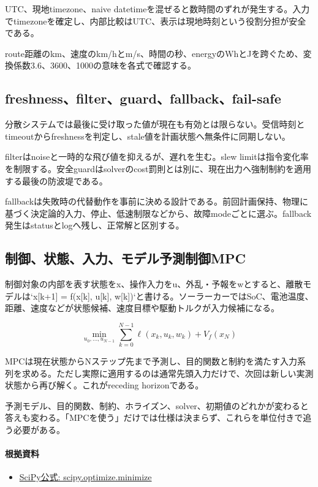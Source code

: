 \documentclass[a4paper,11pt]{article}
\begin{document}
UTC、現地timezone、naive datetimeを混ぜると数時間のずれが発生する。入力でtimezoneを確定し、内部比較はUTC、表示は現地時刻という役割分担が安全である。


route距離のkm、速度のkm/hとm/s、時間の秒、energyのWhとJを跨ぐため、変換係数3.6、3600、1000の意味を各式で確認する。



\subsection{freshness、filter、guard、fallback、fail-safe}
分散システムでは最後に受け取った値が現在も有効とは限らない。受信時刻とtimeoutからfreshnessを判定し、stale値を計画状態へ無条件に同期しない。


filterはnoiseと一時的な飛び値を抑えるが、遅れを生む。slew limitは指令変化率を制限する。安全guardはsolverのcost罰則とは別に、現在出力へ強制制約を適用する最後の防波堤である。


fallbackは失敗時の代替動作を事前に決める設計である。前回計画保持、物理に基づく決定論的入力、停止、低速制限などから、故障modeごとに選ぶ。fallback発生はstatusとlogへ残し、正常解と区別する。



\subsection{制御、状態、入力、モデル予測制御MPC}
制御対象の内部を表す状態をx、操作入力をu、外乱・予報をwとすると、離散モデルは`x[k+1] = f(x[k], u[k], w[k])`と書ける。ソーラーカーではSoC、電池温度、距離、速度などが状態候補、速度目標や駆動トルクが入力候補になる。


\[
\min_{u_0,\ldots,u_{N-1}} \sum_{k=0}^{N-1}\ell(x_k,u_k,w_k)+V_f(x_N)
\]

MPCは現在状態からNステップ先まで予測し、目的関数と制約を満たす入力系列を求める。ただし実際に適用するのは通常先頭入力だけで、次回は新しい実測状態から再び解く。これがreceding horizonである。


予測モデル、目的関数、制約、ホライズン、solver、初期値のどれかが変わると答えも変わる。「MPCを使う」だけでは仕様は決まらず、これらを単位付きで追う必要がある。

\paragraph{根拠資料}
\begin{itemize}[leftmargin=1.6em]
\item \href{https://docs.scipy.org/doc/scipy/reference/generated/scipy.optimize.minimize.html}{SciPy公式: scipy.optimize.minimize}
\end{itemize}
\end{document}

